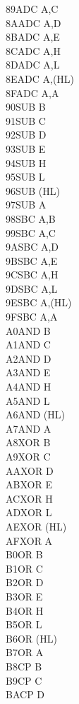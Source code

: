 \documentclass[oneside,a4paper]{book}
\begin{document}
\begin{multicols}{3}
{\begin{tabbing}
89\>ADC A,C\\
8A\>ADC A,D\\
8B\>ADC A,E\\
8C\>ADC A,H\\
8D\>ADC A,L\\
8E\>ADC A,(HL)\\
8F\>ADC A,A\\
90\>SUB B\\
91\>SUB C\\
92\>SUB D\\
93\>SUB E\\
94\>SUB H\\
95\>SUB L\\
96\>SUB (HL)\\
97\>SUB A\\
98\>SBC A,B\\
99\>SBC A,C\\
9A\>SBC A,D\\
9B\>SBC A,E\\
9C\>SBC A,H\\
9D\>SBC A,L\\
9E\>SBC A,(HL)\\
9F\>SBC A,A\\
A0\>AND B\\
A1\>AND C\\
A2\>AND D\\
A3\>AND E\\
A4\>AND H\\
A5\>AND L\\
A6\>AND (HL)\\
A7\>AND A\\
A8\>XOR B\\
A9\>XOR C\\
AA\>XOR D\\
AB\>XOR E\\
AC\>XOR H\\
AD\>XOR L\\
AE\>XOR (HL)\\
AF\>XOR A\\
B0\>OR B\\
B1\>OR C\\
B2\>OR D\\
B3\>OR E\\
B4\>OR H\\
B5\>OR L\\
B6\>OR (HL)\\
B7\>OR A\\
B8\>CP B\\
B9\>CP C\\
BA\>CP D\\

\end{tabbing}}
\end{multicols}
\end{document}
